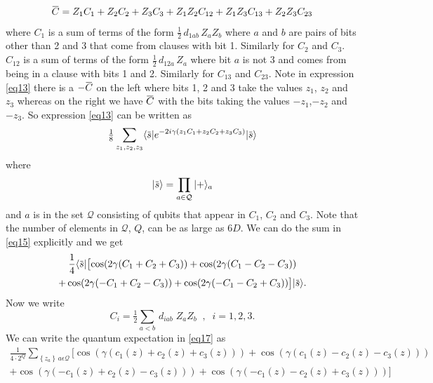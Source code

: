 \documentclass[t11pt,preprint,preprintnumbers]{revtex4}
\newcommand{\overbar}[1]{\mkern 1.5mu\overline{\mkern-1.5mu#1\mkern-1.5mu}\mkern 1.5mu}
\begin{document}
\begin{equation}
\overbar{C}=Z_1C_1 + Z_2C_2 + Z_3C_3 + Z_1Z_2C_{12} + Z_1 Z_3 C_{13} + Z_2 Z_3 C_{23}
\label{eq14}
\end{equation}
\noindent where $C_1$ is a sum of terms of the form  $\frac{1}{2}\, d_{1ab}\, Z_a  Z_b$ where $a$ and $b$ are pairs of bits other than 2 and 3 that come from clauses with bit 1.  Similarly for $C_2$ and $C_3$.   $C_{12}$ is a sum of terms of the form $\frac{1}{2}\, d_{12a}\, Z_a$ where bit $a$ is not  3 and comes from being in a clause with bits 1 and 2. Similarly for $C_{13}$ and $C_{23}$.    Note in expression \eqref{eq13} there is a $-\overbar{C}$ on the left where bits 1, 2 and 3 take the values $z_1$, $z_2$ and $z_3$ whereas on the right we have $\overbar{C}$ with the bits taking the values $-z_1$,$-z_2$ and $-z_3$.  So expression \eqref{eq13} can be written as
\begin{equation}
\tfrac{1}{8}\sum_{z_1,z_2,z_3}   \langle \overbar{s} | e^{-2 i \gamma \left(z_1 C_1+ z_2 C_2+z_3 C_3\right)} | \overbar{s} \rangle
\label{eq15}
\end{equation}
\noindent where
\begin{equation}\label{eq16}
|\overbar{s}\rangle = \prod_{a\in\mathcal{Q}}  | + \rangle_a 
\end{equation}
and $a$ is in the set $\mathcal{Q}$ consisting of qubits that appear in $C_1$, $C_2$ and $C_3$.  Note that the number of elements in $\mathcal{Q}$, $Q$, can be as large as $6D$.  We can do the sum in \eqref{eq15} explicitly and we get
\begin{multline}\label{eq17}
\frac{1}{4} \langle \overbar{s} | \bigl[\cos(2 \gamma (C_1+C_2+C_3)) + \cos(2\gamma (C_1-C_2-C_3))\\  
+\cos(2 \gamma (-C_1+ C_2 - C_3)) +\cos(2 \gamma (- C_1 - C_2 + C_3))\bigr] | \overbar{s} \rangle .
\end{multline}
\noindent Now we write 
\begin{equation}\label{eq18}
C_i = \tfrac{1}{2}\sum_{a<b}\, d_{iab}\; Z_a Z_b \; \; , \; \;i = 1,2,3.
\end{equation}
\noindent    We can write the quantum expectation in \eqref{eq17} as %
\begin{multline}\label{eq19}
\frac{1}{4\cdot2^Q} \sum_{\left\{z_a\right\}\, a \epsilon \mathcal{Q}}\bigl[\cos(\gamma (c_1(z)+c_2(z)+c_3(z)))+\cos(\gamma (c_1(z)-c_2(z)-c_3(z)))\\ 
+\cos(\gamma (-c_1(z) + c_2(z) - c_3(z)))+\cos(\gamma (-c_1(z)- c_2(z)+ c_3(z)))\bigr]
\end{multline}
\end{document}
